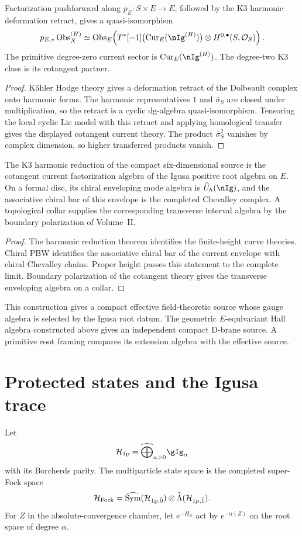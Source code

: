 \begin{theorem}
Factorization pushforward along $p_E:S\times E\to E$, followed by the K3 harmonic deformation retract, gives a quasi-isomorphism
\[
 p_{E,*}\Obs_X^{(H)}
 \simeq
 \Obs_E\!\left(
 T^*[-1]\bigl(\Cur_E(\nIg^{(H)})\bigr)
 \tensor H^{0,\bullet}(S,\Ocal_S)
 \right).
\]
The primitive degree-zero current sector is $\Cur_E(\nIg^{(H)})$.  The degree-two K3 class is its cotangent partner.
\end{theorem}
\begin{proof}
Kähler Hodge theory gives a deformation retract of the Dolbeault complex onto harmonic forms.  The harmonic representatives $1$ and $\bar\sigma_S$ are closed under multiplication, so the retract is a cyclic dg-algebra quasi-isomorphism.  Tensoring the local cyclic Lie model with this retract and applying homological transfer gives the displayed cotangent current theory.  The product $\bar\sigma_S^2$ vanishes by complex dimension, so higher transferred products vanish.
\end{proof}

\begin{corollary}
The K3 harmonic reduction of the compact six-dimensional source is the cotangent current factorization algebra of the Igusa positive root algebra on $E$.  On a formal disc, its chiral enveloping mode algebra is $\widehat U_h(\nIg)$, and the associative chiral bar of this envelope is the completed Chevalley complex.  A topological collar supplies the corresponding transverse interval algebra by the boundary polarization of Volume~II.
\end{corollary}
\begin{proof}
The harmonic reduction theorem identifies the finite-height curve theories.  Chiral PBW identifies the associative chiral bar of the current envelope with chiral Chevalley chains.  Proper height passes this statement to the complete limit.  Boundary polarization of the cotangent theory gives the transverse enveloping algebra on a collar.
\end{proof}

This construction gives a compact effective field-theoretic source whose gauge algebra is selected by the Igusa root datum.  The geometric $E$-equivariant Hall algebra constructed above gives an independent compact D-brane source.  A primitive root framing compares its extension algebra with the effective source.

\chapter{Protected states and the Igusa trace}
Let
\[
 \mathcal H_{\mathrm{1p}}
 =\widehat\bigoplus_{\alpha>0}\gIg_\alpha
\]
with its Borcherds parity.  The multiparticle state space is the completed super-Fock space
\[
 \mathcal H_{\mathrm{Fock}}=\widehat{\operatorname{Sym}}(\mathcal H_{\mathrm{1p},\bar0})
 \otimes\widehat\Lambda(\mathcal H_{\mathrm{1p},\bar1}).
\]
For $Z$ in the absolute-convergence chamber, let $e^{-H_Z}$ act by $e^{-\alpha(Z)}$ on the root space of degree $\alpha$.

